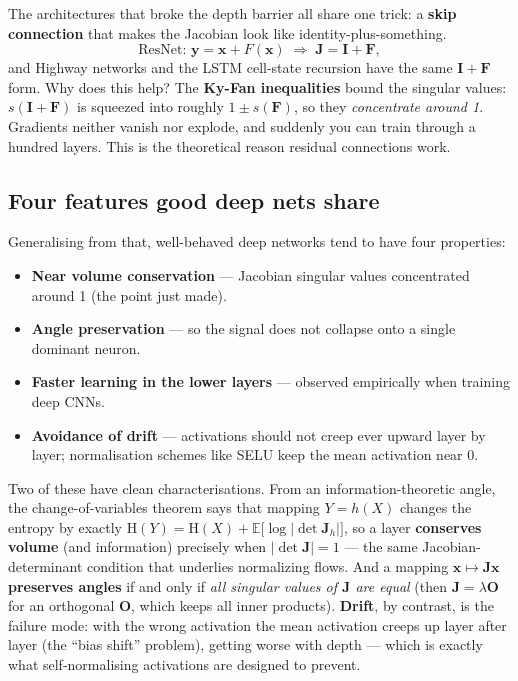 \documentclass[11pt, oneside]{book}
\newcommand{\E}{\mathbb{E}}              %
\newcommand{\Ent}{\mathrm{H}}
\newcommand{\eye}{\mathbf{I}}
\newcommand{\xvec}{\mathbf{x}}
\newcommand{\yvec}{\mathbf{y}}
\begin{document}
The architectures that broke the depth barrier all share one trick: a
\textbf{skip connection} that makes the Jacobian look like identity-plus-something.
\[
  \text{ResNet: } \yvec = \xvec + F(\xvec)
  \;\Rightarrow\;
  \mathbf{J} = \eye + \mathbf{F},
\]
and Highway networks and the LSTM cell-state recursion have the same $\eye+\mathbf{F}$
form. Why does this help? The \textbf{Ky-Fan inequalities} bound the singular
values: $s(\eye+\mathbf{F})$ is squeezed into roughly $1\pm s(\mathbf{F})$, so they
\emph{concentrate around 1}. Gradients neither vanish nor explode, and suddenly you
can train through a hundred layers. This is the theoretical reason residual
connections work.

\subsection{Four features good deep nets share}

Generalising from that, well-behaved deep networks tend to have four properties:
\begin{itemize}
  \item \textbf{Near volume conservation} --- Jacobian singular values concentrated
        around 1 (the point just made).
  \item \textbf{Angle preservation} --- so the signal does not collapse onto a
        single dominant neuron.
  \item \textbf{Faster learning in the lower layers} --- observed empirically when
        training deep CNNs.
  \item \textbf{Avoidance of drift} --- activations should not creep ever upward
        layer by layer; normalisation schemes like SELU keep the mean activation
        near 0.
\end{itemize}

Two of these have clean characterisations. From an information-theoretic angle, the
change-of-variables theorem says that mapping $Y=h(X)$ changes the entropy by
exactly $\Ent(Y) = \Ent(X) + \E\bigl[\log|\det \mathbf{J}_h|\bigr]$, so a layer
\textbf{conserves volume} (and information) precisely when $|\det\mathbf{J}|=1$ ---
the same Jacobian-determinant condition that underlies normalizing flows. And a
mapping $\xvec\mapsto\mathbf{J}\xvec$ \textbf{preserves angles} if and only if
\emph{all singular values of $\mathbf{J}$ are equal} (then $\mathbf{J}=\lambda\mathbf{O}$
for an orthogonal $\mathbf{O}$, which keeps all inner products). \textbf{Drift}, by
contrast, is the failure mode: with the wrong activation the mean activation
creeps up layer after layer (the ``bias shift'' problem), getting worse with depth
--- which is exactly what self-normalising activations are designed to prevent.
\end{document}
